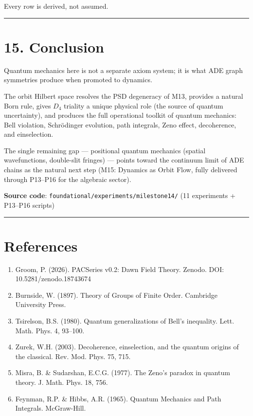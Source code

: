\documentclass[11pt,a4paper]{article}
\providecommand{\tightlist}{\setlength{\itemsep}{0pt}\setlength{\parskip}{0pt}}
\begin{document}
Every row is derived, not assumed.

\begin{center}\rule{0.5\linewidth}{0.4pt}\end{center}

\section*{15. Conclusion}

Quantum mechanics here is not a separate axiom system; it is what ADE graph symmetries produce when promoted to dynamics.

The orbit Hilbert space resolves the PSD degeneracy of M13, provides a natural Born rule, gives $D_4$ triality a unique physical role (the source of quantum uncertainty), and produces the full operational toolkit of quantum mechanics: Bell violation, Schrödinger evolution, path integrals, Zeno effect, decoherence, and einselection.

The single remaining gap — positional quantum mechanics (spatial wavefunctions, double-slit fringes) — points toward the continuum limit of ADE chains as the natural next step (M15: Dynamics as Orbit Flow, fully delivered through P13–P16 for the algebraic sector).

\textbf{Source code}: \texttt{foundational/experiments/milestone14/} (11 experiments + P13–P16 scripts)

\begin{center}\rule{0.5\linewidth}{0.4pt}\end{center}

\section*{References}

\begin{enumerate}\tightlist
\item Groom, P. (2026). PACSeries v0.2: Dawn Field Theory. Zenodo. DOI: 10.5281/zenodo.18743674
\item Burnside, W. (1897). Theory of Groups of Finite Order. Cambridge University Press.
\item Tsirelson, B.S. (1980). Quantum generalizations of Bell's inequality. Lett. Math. Phys. 4, 93–100.
\item Zurek, W.H. (2003). Decoherence, einselection, and the quantum origins of the classical. Rev. Mod. Phys. 75, 715.
\item Misra, B. \& Sudarshan, E.C.G. (1977). The Zeno's paradox in quantum theory. J. Math. Phys. 18, 756.
\item Feynman, R.P. \& Hibbs, A.R. (1965). Quantum Mechanics and Path Integrals. McGraw-Hill.
\end{enumerate}
\end{document}
